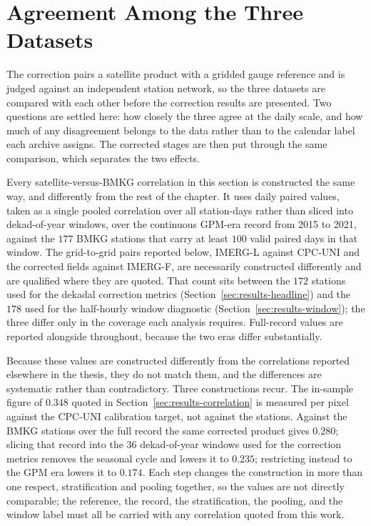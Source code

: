 \section{Agreement Among the Three Datasets}\label{sec:results-intercomparison}

The correction pairs a satellite product with a gridded gauge
reference and is judged against an independent station network, so
the three datasets are compared with each other before the
correction results are presented. Two questions are settled here:
how closely the three agree at the daily scale, and how much of any
disagreement belongs to the data rather than to the calendar label
each archive assigns. The corrected stages are then put through the
same comparison, which separates the two effects.

Every satellite-versus-BMKG correlation in this section is
constructed the same way, and differently from the rest of the
chapter. It uses daily paired values, taken as a single pooled
correlation over all station-days rather than sliced into
dekad-of-year windows, over the continuous GPM-era record from 2015
to 2021, against the $177$ BMKG stations that carry at least $100$
valid paired days in that window. The grid-to-grid
pairs reported below, IMERG-L against CPC-UNI and the corrected
fields against IMERG-F, are necessarily constructed differently
and are qualified where they are quoted. That count sits
between the $172$ stations used for the dekadal correction metrics
(Section~\ref{sec:results-headline}) and the $178$ used for the
half-hourly window diagnostic (Section~\ref{sec:results-window});
the three differ only in the coverage each analysis requires.
Full-record values are reported alongside throughout, because the
two eras differ substantially.

Because these values are constructed differently from the
correlations reported elsewhere in the thesis, they do not match
them, and the differences are systematic rather than
contradictory. Three constructions recur. The in-sample figure of
$0.348$ quoted in Section~\ref{sec:results-correlation} is measured
per pixel against the CPC-UNI calibration target, not against the
stations. Against the BMKG stations over the full record the same
corrected product gives $0.280$; slicing that record into the $36$
dekad-of-year windows used for the correction metrics removes the
seasonal cycle and lowers it to $0.235$; restricting instead to the
GPM era lowers it to $0.174$. Each step changes the construction
in more than one respect, stratification and pooling together, so
the values are not directly comparable; the reference, the record,
the stratification, the pooling, and the window label must all be
carried with any correlation quoted from this work.

